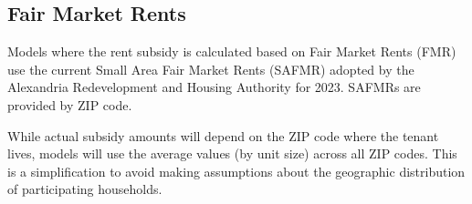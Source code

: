 \documentclass[
  10pt,
  letterpaper,
  DIV=11,
  numbers=noendperiod]{scrartcl}
\begin{document}
\begin{table}[H]

\caption{\label{tbl-hud-ami}FY 2023 MTSP Income Limits for
Washington-Arlington-Alexandria, DC-VA-MD HUD Metro FMR Area}


\end{table}%

\newpage

\subsection{Fair Market Rents}\label{fair-market-rents}

Models where the rent subsidy is calculated based on Fair Market Rents
(FMR) use the current Small Area Fair Market Rents (SAFMR) adopted by
the Alexandria Redevelopment and Housing Authority for 2023. SAFMRs are
provided by ZIP code.

While actual subsidy amounts will depend on the ZIP code where the
tenant lives, models will use the average values (by unit size) across
all ZIP codes. This is a simplification to avoid making assumptions
about the geographic distribution of participating households.
\end{document}
